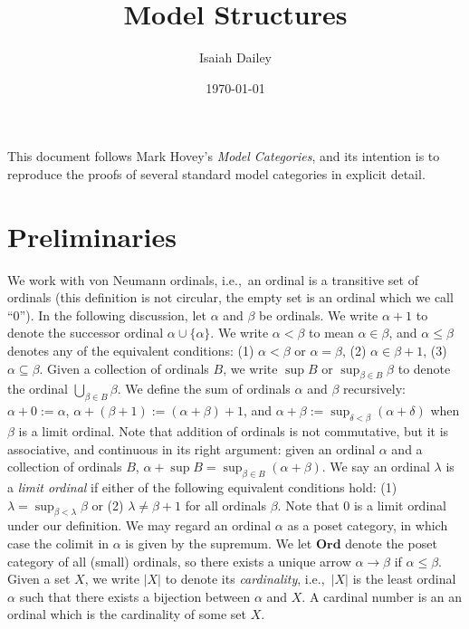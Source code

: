 \documentclass{amsart}
\title{Model Structures}
\author{Isaiah Dailey}
\date{\today}
\theoremstyle{plain}
\theoremstyle{definition}
\newcommand{\Ord}{\mbf{Ord}}
\newcommand{\sseq}{\subseteq}
\newcommand{\0}{\mathbf{0}}
\newcommand{\mbf}[1]{\mathbf{#1}}
\renewcommand{\(}{\left(}
\renewcommand{\)}{\right)}
\begin{document}
\maketitle


\tableofcontents

This document follows Mark Hovey's \textit{Model Categories}, and its intention is to reproduce the proofs of several standard model categories in explicit detail.

\section{Preliminaries}

We work with von Neumann ordinals, i.e.,\ an ordinal is a transitive set of ordinals (this definition is not circular, the empty set is an ordinal which we call ``$0$''). In the following discussion, let $\alpha$ and $\beta$ be ordinals. We write $\alpha+1$ to denote the successor ordinal $\alpha\cup\{\alpha\}$. We write $\alpha<\beta$ to mean $\alpha\in\beta$, and $\alpha\leq\beta$ denotes any of the equivalent conditions: (1) $\alpha<\beta$ or $\alpha=\beta$, (2) $\alpha\in\beta+1$, (3) $\alpha\sseq\beta$. Given a collection of ordinals $B$, we write $\sup B$ or $\sup_{\beta\in B}\beta$ to denote the ordinal $\bigcup_{\beta\in B}\beta$. We define the sum of ordinals $\alpha$ and $\beta$ recursively: $\alpha+0:=\alpha$, $\alpha+(\beta+1):=(\alpha+\beta)+1$, and $\alpha+\beta:=\sup_{\delta<\beta}(\alpha+\delta)$ when $\beta$ is a limit ordinal. Note that addition of ordinals is not commutative, but it is associative, and continuous in its right argument: given an ordinal $\alpha$ and a collection of ordinals $B$, $\alpha+\sup B=\sup_{\beta\in B}(\alpha+\beta)$. We say an ordinal $\lambda$ is a \textit{limit ordinal} if either of the following equivalent conditions hold: (1) $\lambda=\sup_{\beta<\lambda}\beta$ or (2) $\lambda\neq\beta+1$ for all ordinals $\beta$. Note that $0$ is a limit ordinal under our definition. We may regard an ordinal $\alpha$ as a poset category, in which case the colimit in $\alpha$ is given by the supremum. We let $\Ord$ denote the poset category of all (small) ordinals, so there exists a unique arrow $\alpha\to\beta$ if $\alpha\leq\beta$. Given a set $X$, we write $|X|$ to denote its \textit{cardinality}, i.e.,\ $|X|$ is the least ordinal $\alpha$ such that there exists a bijection between $\alpha$ and $X$. A cardinal number is an an ordinal which is the cardinality of some set $X$.
\end{document}
